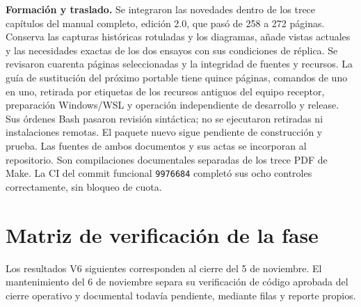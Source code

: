 \documentclass[11pt,letterpaper]{article}
\newcommand{\file}[1]{\texttt{#1}}
\begin{document}
\textbf{Formación y traslado.} Se integraron las novedades dentro de los trece
capítulos del manual completo, edición 2.0, que pasó de 258 a 272 páginas. Conserva
las capturas históricas rotuladas y los diagramas, añade vistas actuales y las
necesidades exactas de los dos ensayos con sus condiciones de réplica. Se revisaron
cuarenta páginas seleccionadas y la integridad de fuentes y recursos. La guía de
sustitución del próximo portable tiene quince páginas, comandos de uno en uno,
retirada por etiquetas de los recursos antiguos del equipo receptor, preparación
Windows/WSL y operación independiente de desarrollo y release. Sus órdenes Bash
pasaron revisión sintáctica; no se ejecutaron retiradas ni instalaciones remotas.
El paquete nuevo sigue pendiente de construcción y prueba. Las fuentes de ambos
documentos y sus actas se incorporan al repositorio. Son compilaciones documentales
separadas de los trece PDF de Make. La CI del commit funcional \file{9976684}
completó sus ocho controles correctamente, sin bloqueo de cuota.

\section{Matriz de verificación de la fase}

Los resultados V6 siguientes corresponden al cierre del 5 de noviembre. El
mantenimiento del 6 de noviembre separa su verificación de código aprobada del
cierre operativo y documental todavía pendiente, mediante filas y reporte propios.
\end{document}
